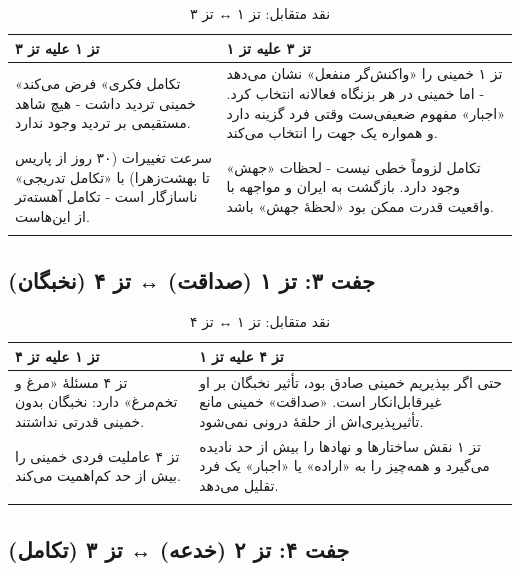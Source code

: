 \documentclass[12pt,a4paper]{book}
\begin{document}
\begin{longtable}{%
    >{\raggedleft\arraybackslash}p{}
    >{\raggedleft\arraybackslash}p{}}
\toprule
\rowcolor{cGreen!10}
\textbf{تز ۱ علیه تز ۳} &
\rowcolor{cGold!10}
\textbf{تز ۳ علیه تز ۱} \\
\midrule

«تکامل فکری» فرض می‌کند خمینی تردید داشت - هیچ شاهد مستقیمی بر تردید وجود ندارد. &
تز ۱ خمینی را «واکنش‌گر منفعل» نشان می‌دهد - اما خمینی در هر بزنگاه فعالانه انتخاب کرد. «اجبار» مفهوم ضعیفی‌ست وقتی فرد گزینه دارد و همواره یک جهت را انتخاب می‌کند. \\
\midrule

سرعت تغییرات (۳۰ روز از پاریس تا بهشت‌زهرا) با «تکامل تدریجی» ناسازگار است - تکامل آهسته‌تر از این‌هاست. &
تکامل لزوماً خطی نیست - لحظات «جهش» وجود دارد. بازگشت به ایران و مواجهه با واقعیت قدرت ممکن بود «لحظهٔ جهش» باشد. \\

\bottomrule
\caption{نقد متقابل: تز ۱ ↔ تز ۳}
\end{longtable}

\subsection{جفت ۳: تز ۱ (صداقت) ↔ تز ۴ (نخبگان)}

\begin{longtable}{%
    >{\raggedleft\arraybackslash}p{}
    >{\raggedleft\arraybackslash}p{}}
\toprule
\rowcolor{cGreen!10}
\textbf{تز ۱ علیه تز ۴} &
\rowcolor{cConsolid!8}
\textbf{تز ۴ علیه تز ۱} \\
\midrule

تز ۴ مسئلهٔ «مرغ و تخم‌مرغ» دارد: نخبگان بدون خمینی قدرتی نداشتند. &
حتی اگر بپذیریم خمینی صادق بود، تأثیر نخبگان بر او غیرقابل‌انکار است. «صداقت» خمینی مانع تأثیرپذیری‌اش از حلقهٔ درونی نمی‌شود. \\
\midrule

تز ۴ عاملیت فردی خمینی را بیش از حد کم‌اهمیت می‌کند. &
تز ۱ نقش ساختارها و نهادها را بیش از حد نادیده می‌گیرد و همه‌چیز را به «اراده» یا «اجبار» یک فرد تقلیل می‌دهد. \\

\bottomrule
\caption{نقد متقابل: تز ۱ ↔ تز ۴}
\end{longtable}

\subsection{جفت ۴: تز ۲ (خدعه) ↔ تز ۳ (تکامل)}
\end{document}
